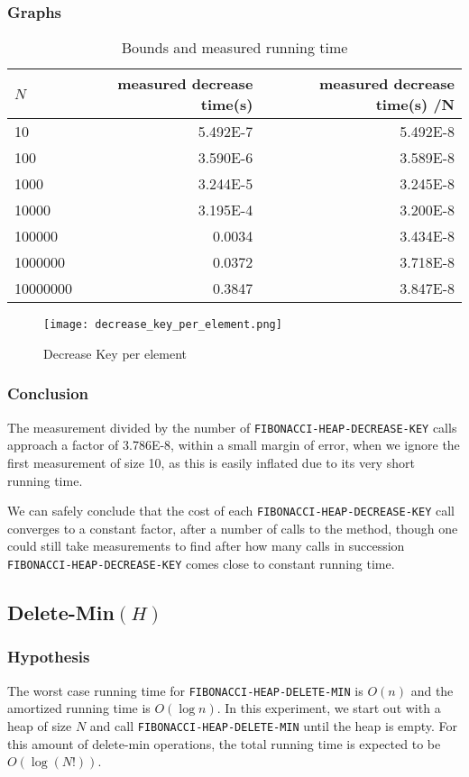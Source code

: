 \documentclass[a4paper,oneside,11pt]{article}
\begin{document}
\begin{itemize}
\subsubsection*{Graphs}
\begin{table}
  \begin{center}
    \begin{tabular}{l|r|r}
      $N$ & measured decrease time(s) & measured decrease time(s) /N \\
      \hline
      10       & \num{5.492E-7}     & \num{5.492E-8}\\
      100      & \num{3.590E-6}     & \num{3.589E-8}\\
      1000     & \num{3.244E-5}     & \num{3.245E-8}\\
      10000    & \num{3.195E-4}     & \num{3.200E-8}\\
      100000   & \num{0.0034}       & \num{3.434E-8}\\
      1000000  & \num{0.0372}       & \num{3.718E-8}\\
      10000000 & \num{0.3847}       & \num{3.847E-8}
    \end{tabular}
    \caption{Bounds and measured running time}
  \end{center}
\end{table}
\begin{figure}
  \texttt{[image: decrease\_key\_per\_element.png]}
  \caption{Decrease Key per element}
\end{figure}

\subsubsection*{Conclusion}
The measurement divided by the number of \texttt{FIBONACCI-HEAP-DECREASE-KEY} calls approach a factor of \num{3.786E-8}, within a small margin of error, when we ignore the first measurement of size 10, as this is easily inflated due to its very short running time.

We can safely conclude that the cost of each \texttt{FIBONACCI-HEAP-DECREASE-KEY} call converges to a constant factor, after a number of calls to the method, though one could still take measurements to find after how many calls in succession \texttt{FIBONACCI-HEAP-DECREASE-KEY} comes close to constant running time.

\subsection*{Delete-Min$(H)$}
\subsubsection*{Hypothesis}
The worst case running time for \texttt{FIBONACCI-HEAP-DELETE-MIN} is $O(n)$ and the amortized running time is $O(\log n)$. In this experiment, we start out with a heap of size $N$ and call \texttt{FIBONACCI-HEAP-DELETE-MIN} until the heap is empty. For this amount of delete-min operations, the total running time is expected to be $O(\log(N!))$.


\end{itemize}
\end{document}
